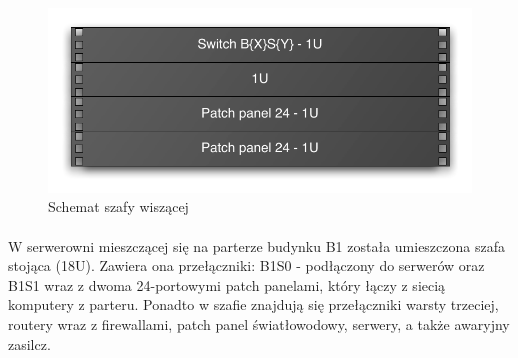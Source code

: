 \begin{figure}[H]
  \begin{center}
    \includegraphics[width=\textwidth]{img/s/szafa-mala.pdf}
    \caption{Schemat szafy wiszącej}
  \end{center}
\end{figure}

\paragraph{}
W serwerowni mieszczącej się na parterze budynku B1 została umieszczona szafa stojąca (18U).
Zawiera ona przełączniki: B1S0 - podłączony do serwerów oraz B1S1 wraz z dwoma 24-portowymi patch panelami, który łączy z siecią komputery z parteru.
Ponadto w szafie znajdują się przełączniki warsty trzeciej, routery wraz z firewallami, patch panel światłowodowy, serwery, a także awaryjny zasilcz.


